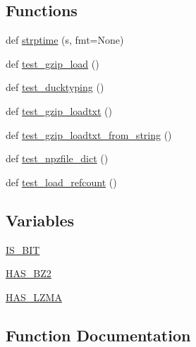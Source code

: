 \subsection*{Functions}
\begin{DoxyCompactItemize}
\item 
def \hyperlink{namespacenumpy_1_1lib_1_1tests_1_1test__io_a742480a8c198eb2719a0458c1a1bfa26}{strptime} (s, fmt=None)
\item 
def \hyperlink{namespacenumpy_1_1lib_1_1tests_1_1test__io_aeef1814be561297be81100de4b37cc42}{test\+\_\+gzip\+\_\+load} ()
\item 
def \hyperlink{namespacenumpy_1_1lib_1_1tests_1_1test__io_ad1670ac4acfa93782b39fed1ace61b5b}{test\+\_\+ducktyping} ()
\item 
def \hyperlink{namespacenumpy_1_1lib_1_1tests_1_1test__io_a560a8f46459f70fb8892d75979845e3a}{test\+\_\+gzip\+\_\+loadtxt} ()
\item 
def \hyperlink{namespacenumpy_1_1lib_1_1tests_1_1test__io_aba25b4c2d04b2219ff1f3c9e42a0d12c}{test\+\_\+gzip\+\_\+loadtxt\+\_\+from\+\_\+string} ()
\item 
def \hyperlink{namespacenumpy_1_1lib_1_1tests_1_1test__io_af55aecd30e71677a87bba450804021b7}{test\+\_\+npzfile\+\_\+dict} ()
\item 
def \hyperlink{namespacenumpy_1_1lib_1_1tests_1_1test__io_aaa50e1876ad49aea94b979f58b94e79a}{test\+\_\+load\+\_\+refcount} ()
\end{DoxyCompactItemize}
\subsection*{Variables}
\begin{DoxyCompactItemize}
\item 
\hyperlink{namespacenumpy_1_1lib_1_1tests_1_1test__io_af119a819a9abe48d1fb00f41d4010b73}{I\+S\+\_\+B\+IT}
\item 
\hyperlink{namespacenumpy_1_1lib_1_1tests_1_1test__io_a3e2ff21bf4b024760d84c707fd076b58}{H\+A\+S\+\_\+\+B\+Z2}
\item 
\hyperlink{namespacenumpy_1_1lib_1_1tests_1_1test__io_a5c0bb537bce6034be69009082e53fceb}{H\+A\+S\+\_\+\+L\+Z\+MA}
\end{DoxyCompactItemize}


\subsection{Function Documentation}
\mbox{\label{namespacenumpy_1_1lib_1_1tests_1_1test__io_a742480a8c198eb2719a0458c1a1bfa26}} 
